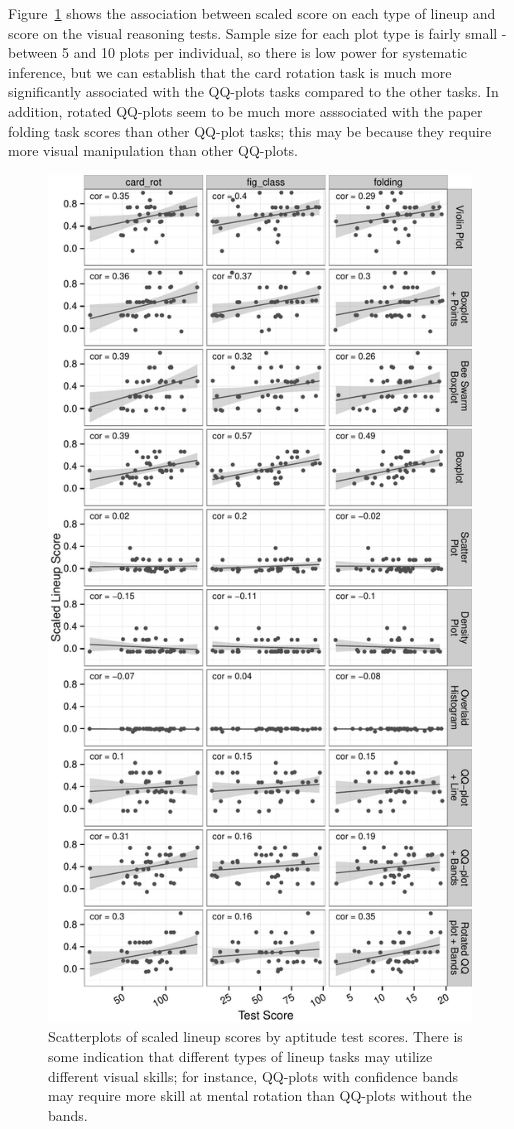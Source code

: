 \documentclass[11pt]{isuthesis}\usepackage[]{graphicx}\usepackage[]{color}
\begin{document}
Figure~\ref{fig:scatterplottypes} shows the association between scaled score on each type of lineup and score on the visual reasoning tests. Sample size for each plot type is fairly small - between 5 and 10 plots per individual, so there is low power for systematic inference, but we can establish that the card rotation task is much more significantly associated with the QQ-plots tasks compared to the other tasks. In addition, rotated QQ-plots seem to be much more asssociated with the paper folding task scores than other QQ-plot tasks; this may be because they require more visual manipulation than other QQ-plots.



\begin{figure}[ht]\centering
\includegraphics[width=.5\linewidth]{fig-lineup-types-scores-1}
\caption[Scatterplots of scaled lineup scores by aptitude test scores]{Scatterplots of scaled lineup scores by aptitude test scores. There is some indication that different types of lineup tasks may utilize different visual skills; for instance, QQ-plots with confidence bands may require more skill at mental rotation than QQ-plots without the bands. \label{fig:scatterplottypes}}
\end{figure}
\end{document}
